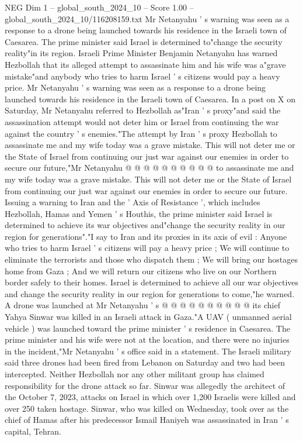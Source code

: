 \begin{textsample}{NEG Dim 1 – global\_south\_2024\_10 – Score 1.00 – global\_south\_2024\_10/116208159.txt}  \label{ex:f1_neg_284}
Mr Netanyahu ' s warning was seen as a response to a drone being launched towards his residence in the Israeli town of Caesarea.
The prime minister said Israel is determined to"change the security reality"in its region.
Israeli Prime Minister Benjamin Netanyahu has warned Hezbollah that its alleged attempt to assassinate him and his wife was a"grave mistake"and anybody who tries to harm Israel ' s citizens would pay a heavy price.
Mr Netanyahu ' s warning was seen as a response to a drone being launched towards his residence in the Israeli town of Caesarea.
In a post on X on Saturday, Mr Netanyahu referred to Hezbollah as"Iran ' s proxy"and said the assassination attempt would not deter him or Israel from continuing the war against the country ' s enemies."The attempt by Iran ' s proxy Hezbollah to assassinate me and my wife today was a grave mistake.
This will not deter me or the State of Israel from continuing our just war against our enemies in order to secure our future,"Mr Netanyahu @ @ @ @ @ @ @ @ @ @ to assassinate me and my wife today was a grave mistake.
This will not deter me or the State of Israel from continuing our just war against our enemies in order to secure our future.
Issuing a warning to Iran and the ' Axis of Resistance ', which includes Hezbollah, Hamas and Yemen ' s Houthis, the prime minister said Israel is determined to achieve its war objectives and"change the security reality in our region for generations"."I say to Iran and its proxies in its axis of evil : Anyone who tries to harm Israel ' s citizens will pay a heavy price ; We will continue to eliminate the terrorists and those who dispatch them ; We will bring our hostages home from Gaza ; And we will return our citizens who live on our Northern border safely to their homes.
Israel is determined to achieve all our war objectives and change the security reality in our region for generations to come,"he warned.
A drone was launched at Mr Netanyahu ' s @ @ @ @ @ @ @ @ @ @ its chief Yahya Sinwar was killed in an Israeli attack in Gaza."A UAV ( unmanned aerial vehicle ) was launched toward the prime minister ' s residence in Caesarea.
The prime minister and his wife were not at the location, and there were no injuries in the incident,"Mr Netanyahu ' s office said in a statement.
The Israeli military said three drones had been fired from Lebanon on Saturday and two had been intercepted.
Neither Hezbollah nor any other militant group has claimed responsibility for the drone attack so far.
Sinwar was allegedly the architect of the October 7, 2023, attacks on Israel in which over 1,200 Israelis were killed and over 250 taken hostage.
Sinwar, who was killed on Wednesday, took over as the chief of Hamas after his predecessor Ismail Haniyeh was assassinated in Iran ' s capital, Tehran.

\end{textsample}
